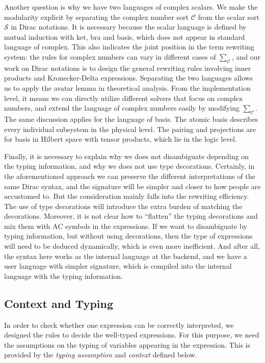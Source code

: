 Another question is why we have two languages of complex scalars.
We make the modularity explicit by separating the complex number sort $\mathcal{C}$ from the scalar sort $\mathcal{S}$ in Dirac notations. It is necessary because the scalar language is defined by mutual induction with ket, bra and basis, which does not appear in standard language of complex. This also indicates the joint position in the term rewriting system: the rules for complex numbers can vary in different cases of $\sum_\mathcal{C}$, and our work on Dirac notations is to design the general rewriting rules involving inner products and Kronecker-Delta expressions. Separating the two languages allows us to apply the avatar lemma in theoretical analysis. From the implementation level, it means we can directly utilize different solvers that focus on complex numbers, and extend the language of complex numbers easily by modifying $\sum_\mathcal{C}$.
The same discussion applies for the language of basis. The atomic basis describes every individual subsystem in the physical level. The pairing and projections are for basis in Hilbert space with tensor products, which lie in the logic level.

Finally, it is necessary to explain why we does not disambiguate depending on the typing information, and why we does not use type decorations.
Certainly, in the aforementioned approach we can preserve the different interpretations of the same Dirac syntax, and the signature will be simpler and closer to how people are accustomed to.
But the consideration mainly falls into 
the rewriting efficiency. 
The use of type decorations will introduce the extra burden of matching the decorations. Moreover, it is not clear how to ``flatten'' the typing decorations and mix them with AC symbols in the expressions.
If we want to disambiguate by typing information, but without using decorations, then the type of expressions will need to be deduced dynamically, which is even more inefficient.
And after all, the syntax here works as the internal language at the backend, and we have a user language with simpler signature, which is compiled into the internal language with the typing information.





\subsection{Context and Typing}
In order to check whether one expression can be correctly interpreted, we designed the rules to decide the well-typed expressions. For this purpose, we need the assumptions on the typing of variables appearing in the expression. This is provided by the \textit{typing assumption} and \textit{context} defined below.

